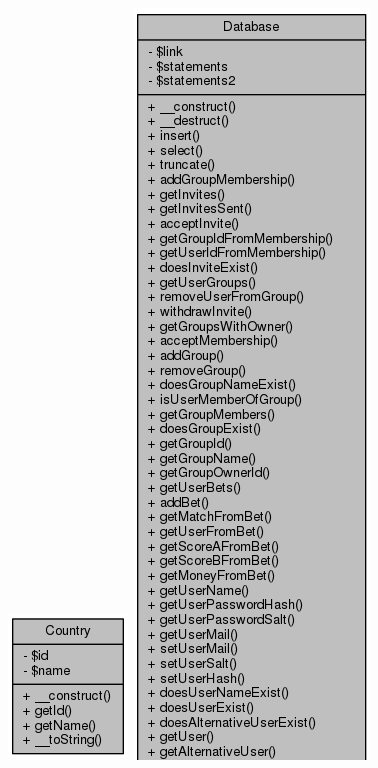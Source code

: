 \documentclass[11pt]{article}
\begin{document}
\includegraphics[scale=0.4]{UML_Country.png}
\includegraphics[scale=0.4]{UML_Database1.png}
\end{document}
